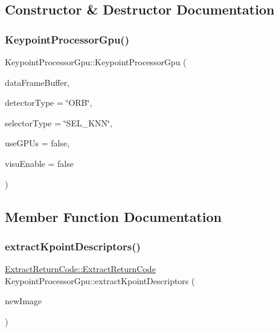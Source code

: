\subsection{Constructor \& Destructor Documentation}
\mbox{\label{classKeypointProcessorGpu_ad08f4085504007fd8a96b4bdd8ee3ecc}} 
\subsubsection{\texorpdfstring{Keypoint\+Processor\+Gpu()}{KeypointProcessorGpu()}}
{\footnotesize\ttfamily Keypoint\+Processor\+Gpu\+::\+Keypoint\+Processor\+Gpu (\begin{DoxyParamCaption}\item[{boost\+::circular\+\_\+buffer$<$ \hyperlink{structDataFrame}{Data\+Frame} $>$ \&}]{data\+Frame\+Buffer,  }\item[{std\+::string}]{detector\+Type = {\ttfamily \char`\"{}ORB\char`\"{}},  }\item[{std\+::string}]{selector\+Type = {\ttfamily \char`\"{}SEL\+\_\+KNN\char`\"{}},  }\item[{bool}]{use\+G\+P\+Us = {\ttfamily false},  }\item[{bool}]{visu\+Enable = {\ttfamily false} }\end{DoxyParamCaption})\hspace{0.3cm}{\ttfamily [inline]}}



\subsection{Member Function Documentation}
\mbox{\label{classKeypointProcessorGpu_a927a3d8480e8da505524c354e5c02c83}} 
\subsubsection{\texorpdfstring{extract\+Kpoint\+Descriptors()}{extractKpointDescriptors()}}
{\footnotesize\ttfamily \hyperlink{namespaceExtractReturnCode_a88d3d56de717f250bf48793769dd57ba}{Extract\+Return\+Code\+::\+Extract\+Return\+Code} Keypoint\+Processor\+Gpu\+::extract\+Kpoint\+Descriptors (\begin{DoxyParamCaption}\item[{cv\+::\+Mat \&}]{new\+Image }\end{DoxyParamCaption})}

